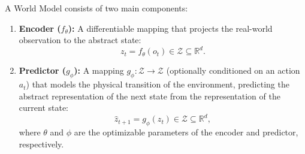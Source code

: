 \documentclass[11pt, oneside, openany]{book}
\begin{document}
\begin{definition}
\label{def:6.1}
A World Model consists of two main components:
\begin{enumerate}
    \item \textbf{Encoder ($f_{\theta}$):} A differentiable mapping that projects the real-world observation to the abstract state:
    \begin{equation}
    \label{eq:6.1}
    z_{t} = f_{\theta}(o_{t}) \in \mathcal{Z} \subseteq \mathbb{R}^{d}.
    \end{equation}
    \item \textbf{Predictor ($g_{\phi}$):} A mapping $g_{\phi} \colon \mathcal{Z} \to \mathcal{Z}$ (optionally conditioned on an action $a_{t}$) that models the physical transition of the environment, predicting the abstract representation of the next state from the representation of the current state:
    \begin{equation}
    \label{eq:6.2}
    \hat{z}_{t+1} = g_{\phi}(z_{t}) \in \mathcal{Z} \subseteq \mathbb{R}^{d},
    \end{equation}
    where $\theta$ and $\phi$ are the optimizable parameters of the encoder and predictor, respectively.
\end{enumerate}
\end{definition}
\end{document}
